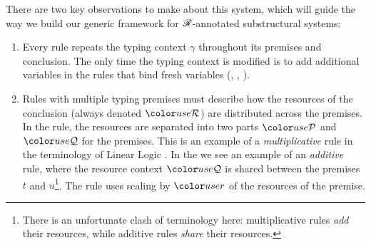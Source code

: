 There are two key observations to make about this system, which will
guide the way we build our generic framework for $\mathscr R$-annotated
substructural systems:
\begin{enumerate}
\item Every rule repeats the typing context $\gamma$ throughout its
  premises and conclusion. The only time the typing context is
  modified is to add additional variables in the rules that bind fresh
  variables (,
  , ).
\item Rules with multiple typing premises must describe how the
  resources of the conclusion (always denoted $\grR$) are distributed
  across the premises. In the  rule, the
  resources are separated into two parts $\grP$ and $\grQ$ for the
  premises. This is an example of a \emph{multiplicative} rule in the
  terminology of Linear Logic \cite{girard87linear}. In the
   we see an example of an
  \emph{additive} rule, where the resource context $\grQ$ is shared
  between the premises $t$ and $u$\footnote{There is an unfortunate
    clash of terminology here: multiplicative rules \emph{add} their
    resources, while additive rules \emph{share} their
    resources.}. The  rule uses scaling
  by $\gr r$ of the resources of the premise.
\end{enumerate}


